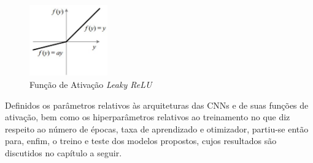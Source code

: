 \begin{figure}[!ht]
     \centering
     \includegraphics[width=0.3\textwidth]{img/lrelu}
     \caption{Função de Ativação \emph{Leaky ReLU}}
     \label{fig:lrelu}
\end{figure}

Definidos os parâmetros relativos às arquiteturas das CNNs e de suas funções de ativação, bem como os hiperparâmetros relativos ao treinamento no que diz respeito ao número de épocas, taxa de aprendizado e otimizador, partiu-se então para, enfim, o treino e teste dos modelos propostos, cujos resultados são discutidos no capítulo a seguir.
